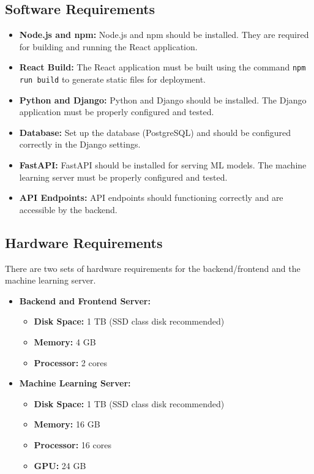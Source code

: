 \subsection{Software Requirements}
\begin{itemize}
    \item \textbf{Node.js and npm:} Node.js and npm should be installed. They are required for building and running the React application.
    \item \textbf{React Build:} The React application must be built using the command \texttt{npm run build} to generate static files for deployment.
    \item \textbf{Python and Django:} Python and Django should be installed. The Django application must be properly configured and tested.
    \item \textbf{Database:} Set up the database (PostgreSQL) and should be configured correctly in the Django settings.
    \item \textbf{FastAPI:} FastAPI should be installed for serving ML models. The machine learning server must be properly configured and tested.
    \item \textbf{API Endpoints:} API endpoints should functioning correctly and are accessible by the backend.
\end{itemize}

\subsection{Hardware Requirements}
There are two sets of hardware requirements for the backend/frontend and the machine learning server.

\begin{itemize}
    \item \textbf{Backend and Frontend Server:}
    \begin{itemize}
        \item \textbf{Disk Space:} 1 TB (SSD class disk recommended)
        \item \textbf{Memory:} 4 GB
        \item \textbf{Processor:} 2 cores
    \end{itemize}
    \item \textbf{Machine Learning Server:}
    \begin{itemize}
        \item \textbf{Disk Space:} 1 TB (SSD class disk recommended)
        \item \textbf{Memory:} 16 GB
        \item \textbf{Processor:} 16 cores
        \item \textbf{GPU:} 24 GB
    \end{itemize}
\end{itemize}

